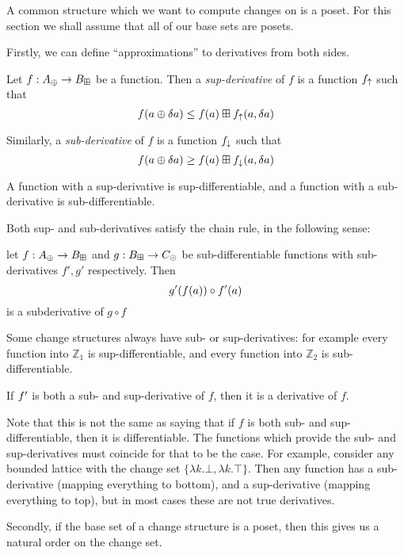 A common structure which we want to compute changes on is a poset. For this
section we shall assume that all of our base sets are posets.

Firstly, we can define ``approximations'' to derivatives from both sides.

\begin{defn}
  Let $f: A_\oplus \rightarrow B_\boxplus$ be a function. Then a \textit{sup-derivative}
  of $f$ is a function $f_\uparrow$ such that
  $$f(a \oplus \delta a) \leq f(a) \boxplus f_\uparrow(a, \delta a)$$
  
  Similarly, a \textit{sub-derivative} of $f$ is a function $f_\downarrow$ such that 
  $$f(a \oplus \delta a) \geq f(a) \boxplus f_\downarrow(a, \delta a)$$

  A function with a sup-derivative is sup-differentiable, and a function with a
  sub-derivative is sub-differentiable.
\end{defn}

Both sup- and sub-derivatives satisfy the chain rule, in the following sense: 
\begin{prop}
  let $f : A_\oplus \rightarrow B_\boxplus$ and $g : B_\boxplus \rightarrow C_\odot$ be
  sub-differentiable functions with sub-derivatives $f', g'$ respectively. Then
  $$g'(f(a)) \circ f'(a)$$ is a subderivative of $g \circ f$
\end{prop}

Some change structures always have sub- or sup-derivatives: for example every function
into $\mathbb{Z}_1$ is sup-differentiable, and every function into $\mathbb{Z}_2$ is 
sub-differentiable.

\begin{prop}
  If $f'$ is both a sub- and sup-derivative of $f$, then it is a derivative of $f$.
\end{prop}

Note that this is not the same as saying that if $f$ is both sub- and
sup-differentiable, then it is differentiable. The functions which provide the
sub- and sup-derivatives must coincide for that to be the case. For example,
consider any bounded lattice with the change set $\{ \lambda k . \bot, \lambda k
 . \top \}$. Then any function has a sub-derivative (mapping everything to
 bottom), and a sup-derivative (mapping everything to top), but in most cases
 these are not true derivatives.

Secondly, if the base set of a change structure is a poset, then this gives us a natural
order on the change set.


